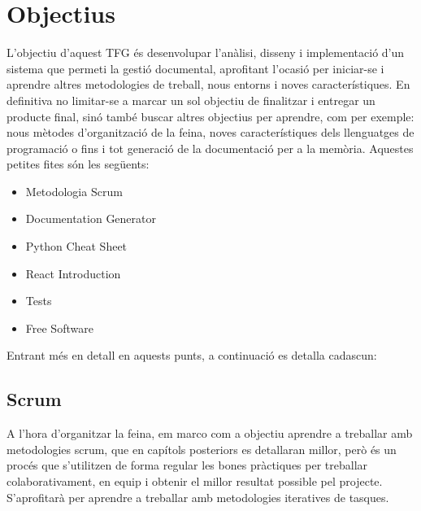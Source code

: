 \documentclass[letterpaper,11pt,catalan]{sphinxmanual}
\begin{document}
\section{Objectius}
\label{\detokenize{index:objectius}}
L'objectiu d'aquest TFG és desenvolupar l'anàlisi, disseny i implementació d'un sistema que permeti la gestió documental,
aprofitant l'ocasió per iniciar-se i aprendre altres metodologies de treball, nous entorns i noves característiques. En definitiva
no limitar-se a marcar un sol objectiu de finalitzar i entregar un producte final, sinó també buscar altres objectius per aprendre, com per exemple:
nous mètodes d'organització de la feina, noves característiques dels llenguatges de programació o fins i tot
generació de la documentació per a la memòria. Aquestes petites fites són les següents:
\begin{itemize}
\item {} 
Metodologia Scrum

\item {} 
Documentation Generator

\item {} 
Python Cheat Sheet

\item {} 
React Introduction

\item {} 
Tests

\item {} 
Free Software

\end{itemize}

Entrant més en detall en aquests punts, a continuació es detalla cadascun:


\subsection{Scrum}
\label{\detokenize{index:scrum}}
A l'hora d'organitzar la feina, em marco com a objectiu aprendre a treballar amb metodologies scrum, que en capítols
posteriors es detallaran millor, però és un procés que s'utilitzen de forma regular les bones
pràctiques per treballar colaborativament, en equip i obtenir el millor resultat possible pel projecte.
S'aprofitarà per aprendre a treballar amb metodologies iteratives de tasques.
\end{document}
